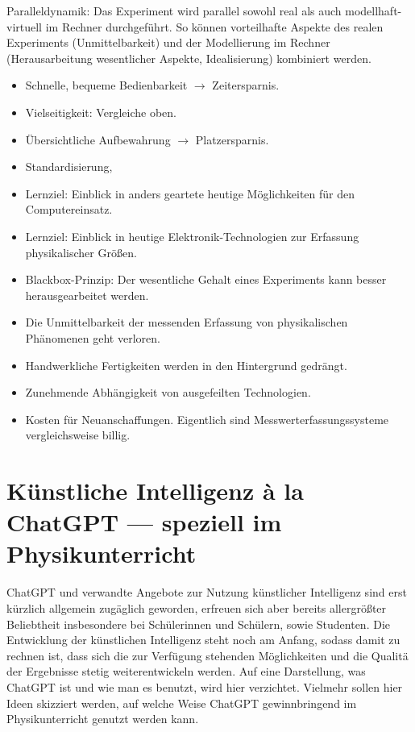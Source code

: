 \mip
Paralleldynamik: Das Experiment wird parallel sowohl real als auch modellhaft-virtuell im Rechner durchgef\"{u}hrt.
So k\"{o}nnen vorteilhafte Aspekte des realen Experiments (Unmittelbarkeit) und der Modellierung im Rechner (Herausarbeitung
wesentlicher Aspekte, Idealisierung) kombiniert werden.

\begin{itemize}
\item Schnelle, bequeme Bedienbarkeit $\to$ Zeitersparnis.
\item Vielseitigkeit: Vergleiche oben.
\item \"{U}bersichtliche Aufbewahrung $\to$ Platzersparnis.
\item Standardisierung,
\item Lernziel: Einblick in anders geartete heutige M\"{o}glichkeiten f\"{u}r den Computereinsatz.
\item Lernziel: Einblick in heutige Elektronik-Technologien zur Erfassung physikalischer Gr\"{o}{\ss}en.
\item Blackbox-Prinzip: Der wesentliche Gehalt eines Experiments kann besser herausgearbeitet werden.
\end{itemize}


\begin{itemize}
\item Die Unmittelbarkeit der messenden Erfassung von physikalischen Ph\"{a}nomenen geht verloren.
\item Handwerkliche Fertigkeiten werden in den Hintergrund gedr\"{a}ngt.
\item Zunehmende Abh\"{a}ngigkeit von ausgefeilten Technologien.
\item Kosten f\"{u}r Neuanschaffungen. Eigentlich sind Messwerterfassungssysteme vergleichsweise billig.
\end{itemize}


\bip\bip
\section{K\"{u}nstliche Intelligenz \`{a} la ChatGPT --- speziell im Physikunterricht}

ChatGPT und verwandte Angebote zur Nutzung k\"{u}nstlicher Intelligenz sind erst k\"{u}rzlich allgemein zug\"{a}glich geworden, erfreuen sich aber bereits allergr\"{o}{\ss}ter Beliebtheit insbesondere bei Sch\"{u}lerinnen und Sch\"{u}lern, sowie Studenten. Die Entwicklung der k\"{u}nstlichen Intelligenz steht noch am Anfang, sodass damit zu rechnen ist, dass sich die zur Verf\"{u}gung stehenden M\"{o}glichkeiten und die Qualit\"{a} der Ergebnisse stetig weiterentwickeln werden. Auf eine Darstellung, was ChatGPT ist und wie man es benutzt, wird hier verzichtet. Vielmehr sollen hier Ideen skizziert werden, auf welche Weise ChatGPT gewinnbringend im Physikunterricht genutzt werden kann.

